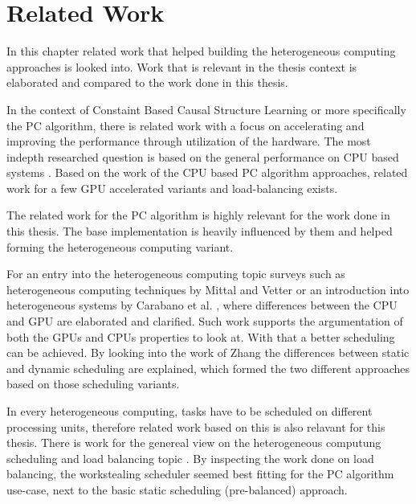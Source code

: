 \chapter{Related Work}
In this chapter related work that helped building the heterogeneous computing approaches is looked into. Work that is relevant in the thesis context is elaborated and compared to the work done in this thesis.

In the context of Constaint Based Causal Structure Learning or more specifically the PC algorithm, there is related work with a focus on accelerating and improving the performance through utilization of the hardware. The most indepth researched question is based on the general performance on CPU based systems \cite{leFastPCAlgorithm2019, leParallelPCPackageEfficient2015, schmidtLoadBalancedParallelConstraintBased2019, colomboOrderIndependentConstraintBasedCausal,kalischEstimatingHighDimensionalDirected2007,scutariBayesianNetworkConstraintBased2017}. Based on the work of the CPU based PC algorithm approaches, related work for a few GPU accelerated variants \cite{schmidtOrderIndependentConstraintBasedCausal2018,zarebavaniCuPCCUDAbasedParallel2018} and load-balancing \cite{schmidtLoadBalancedParallelConstraintBased2019} exists.

The related work for the PC algorithm is highly relevant for the work done in this thesis. The base implementation is heavily influenced by them and helped forming the heterogeneous computing variant.

For an entry into the heterogeneous computing topic surveys such as heterogeneous computing techniques by Mittal and Vetter \cite{mittalSurveyCPUGPUHeterogeneous2015} or an introduction into heterogeneous systems by Carabano et al. \cite{carabanoExplorationHeterogeneousSystems2013}, where differences between the CPU and GPU are elaborated and clarified. Such work supports the argumentation of both the GPUs and CPUs properties to look at. With that a better scheduling can be achieved. By looking into the work of Zhang \cite{zhangDynamicStaticLoad1991} the differences between static and dynamic scheduling are explained, which formed the two different approaches based on those scheduling variants.

In every heterogeneous computing, tasks have to be scheduled on different processing units, therefore related work based on this is also relavant for this thesis. There is work for the genereal view on the heterogeneous computung scheduling and load balancing topic \cite{abdelkaderDynamicTaskScheduling2012,binottoDynamicReconfigurableLoadbalancing2010,galindoDynamicLoadBalancing2008,kopetzRealTimeScheduling1997,kwokStaticSchedulingAlgorithms1999,momcilovicDynamicLoadBalancing2014,singhSurveyStaticScheduling2015}. By inspecting the work done on load balancing, the workstealing scheduler seemed best fitting for the PC algorithm use-case, next to the basic static scheduling (pre-balanced) approach.

